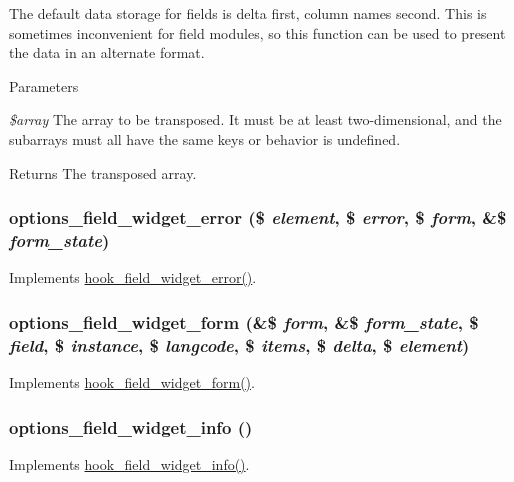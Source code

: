 The default data storage for fields is delta first, column names second. This is sometimes inconvenient for field modules, so this function can be used to present the data in an alternate format.


\begin{DoxyParams}{Parameters}
\item[{\em \$array}]The array to be transposed. It must be at least two-\/dimensional, and the subarrays must all have the same keys or behavior is undefined. \end{DoxyParams}
\begin{DoxyReturn}{Returns}
The transposed array. 
\end{DoxyReturn}
\hypertarget{options_8module_a1027f9d62824a05b68ad460e23a5edcf}{
\subsubsection[{options\_\-field\_\-widget\_\-error}]{\setlength{\rightskip}{0pt plus 5cm}options\_\-field\_\-widget\_\-error (\$ {\em element}, \/  \$ {\em error}, \/  \$ {\em form}, \/  \&\$ {\em form\_\-state})}}
\label{options_8module_a1027f9d62824a05b68ad460e23a5edcf}
Implements \hyperlink{group__field__widget_ga9a2031578542fef9e296d79c946431fd}{hook\_\-field\_\-widget\_\-error()}. \hypertarget{options_8module_a3b29c0fa799d570fc011b1b45e34719f}{
\subsubsection[{options\_\-field\_\-widget\_\-form}]{\setlength{\rightskip}{0pt plus 5cm}options\_\-field\_\-widget\_\-form (\&\$ {\em form}, \/  \&\$ {\em form\_\-state}, \/  \$ {\em field}, \/  \$ {\em instance}, \/  \$ {\em langcode}, \/  \$ {\em items}, \/  \$ {\em delta}, \/  \$ {\em element})}}
\label{options_8module_a3b29c0fa799d570fc011b1b45e34719f}
Implements \hyperlink{group__field__widget_gaa9b0e55fd0eb57ac0f9c7c30d251971b}{hook\_\-field\_\-widget\_\-form()}. \hypertarget{options_8module_a2a5b985f8f891674657082a64718a2f3}{
\subsubsection[{options\_\-field\_\-widget\_\-info}]{\setlength{\rightskip}{0pt plus 5cm}options\_\-field\_\-widget\_\-info ()}}
\label{options_8module_a2a5b985f8f891674657082a64718a2f3}
Implements \hyperlink{group__field__widget_gac53aa6c2a4ac1215660d25b5d7f20792}{hook\_\-field\_\-widget\_\-info()}.


